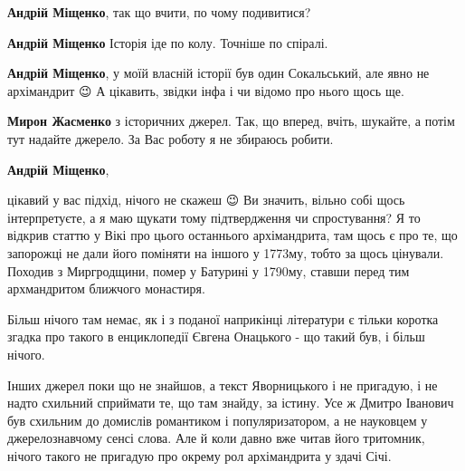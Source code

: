 \begin{itemize}
\begin{itemize}
\textbf{Андрій Міщенко}, так що вчити, по чому подивитися?

 
\textbf{Андрій Міщенко} Історія іде по колу. Точніше по спіралі.

 
\textbf{Андрій Міщенко}, у моїй власній історії був один Сокальський, але явно не архімандрит 😉
А цікавить, звідки інфа і чи відомо про нього щось ще.

 
\textbf{Мирон Жасменко} з історичних джерел. Так, що вперед, вчіть, шукайте, а потім тут надайте джерело. За Вас роботу я не збираюсь робити.

 
\textbf{Андрій Міщенко}, 

цікавий у вас підхід, нічого не скажеш 😉 Ви значить, вільно собі щось
інтерпретуєте, а я маю щукати тому підтвердження чи спростування? Я то відкрив
статтю у Вікі про цього останнього архімандрита, там щось є про те, що
запорожці не дали його поміняти на іншого у 1773му, тобто за щось цінували.
Походив з Миргродщини, помер у Батурині у 1790му, ставши перед тим архмандритом
ближчого монастиря.

Більш нічого там немає, як і з поданої наприкінці літератури є тільки коротка
згадка про такого в енциклопедії Євгена Онацького - що такий був, і більш
нічого.

Інших джерел поки що не знайшов, а текст Яворницького і не пригадую, і не надто
схильний сприймати те, що там знайду, за істину. Усе ж Дмитро Іванович був
схильним до домислів романтиком і популяризатором, а не науковцем у
джерелознавчому сенсі слова. Але й коли давно вже читав його тритомник, нічого
такого не пригадую про окрему рол архімандрита у здачі Січі.


\end{itemize}
\end{itemize}
